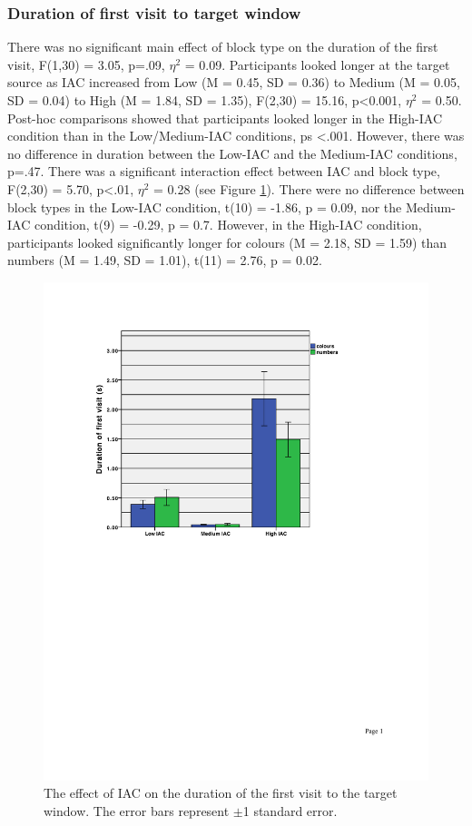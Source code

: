 \documentclass[11pt,oneside]{report}
\begin{document}
\begin{table}
\subsubsection{Duration of first visit to target window}
There was no significant main effect of block type on the duration of the first visit, F(1,30) = 3.05, p=.09, $\eta^2$  = 0.09. Participants looked longer at the target source as IAC increased from Low (M = 0.45, SD = 0.36) to Medium (M = 0.05, SD = 0.04) to High (M = 1.84, SD = 1.35), F(2,30) = 15.16, p<0.001, $\eta^2$  = 0.50. Post-hoc comparisons showed that participants looked longer in the High-IAC condition than in the Low/Medium-IAC conditions, ps <.001. However, there was no difference in duration between the Low-IAC and the Medium-IAC conditions, p=.47. There was a significant interaction effect between IAC and block type, F(2,30) = 5.70, p<.01, $\eta^2$  = 0.28 (see Figure \ref{fig:ch4_firstVisitDuration}). There were no difference between block types in the Low-IAC condition, t(10) = -1.86, p = 0.09, nor the Medium-IAC condition, t(9) = -0.29, p = 0.7. However, in the High-IAC condition, participants looked significantly longer for colours (M = 2.18, SD = 1.59) than numbers (M = 1.49, SD = 1.01), t(11) = 2.76, p = 0.02.

\begin{figure}[!ht]
\centering
\includegraphics[width=\textwidth]{images/Study2/ch4_firstVisitDuration-bargraph.pdf}
\caption{The effect of IAC on the duration of the first visit to the target window. The error bars represent $\pm $1 standard error.}
\vspace{-9pt}
\label{fig:ch4_firstVisitDuration}
\end{figure}


\end{table}
\end{document}
